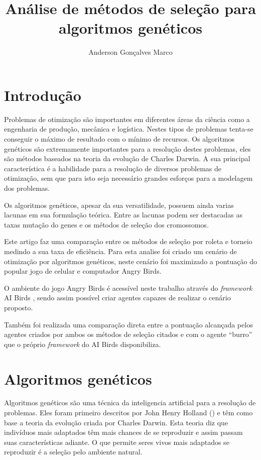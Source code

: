 \documentclass[10pt,a4paper]{article}
\title{Análise de métodos de seleção para algoritmos genéticos}
\author{Anderson Gonçalves Marco}
\date{}
\begin{document}

\maketitle
\section{Introdução}
Problemas de otimização são importantes em diferentes áreas da ciência como a engenharia de produção, mecânica e logística. Nestes tipos de problemas tenta-se conseguir o máximo de resultado com o mínimo de recursos. Os algoritmos genéticos são extremamente importantes para  a resolução destes problemas, eles são métodos baseados na teoria da evolução de Charles Darwin. A sua principal característica é a habilidade para a resolução de diversos problemas de otimização, sem que para isto seja necessário grandes esforços para a modelagem dos problemas.

Os algoritmos genéticos, apesar da sua versatilidade, possuem ainda varias lacunas em sua formulação teórica. Entre as lacunas podem ser destacadas as taxas mutação do genes  e os métodos de seleção dos cromossomos.

Este artigo faz uma comparação entre os métodos de seleção por roleta e torneio medindo a sua taxa de eficiência. Para esta analise foi criado um cenário de otimização por algoritmos genéticos, neste cenário foi maximizado a pontuação do popular jogo de celular e computador Angry Birds. 

O ambiente do jogo Angry Birds é acessível neste trabalho através do \emph{framework} AI Birds \cite{aiBirds}, sendo assim possível criar agentes capazes de realizar o cenário proposto. 

Também foi realizada uma comparação direta entre a pontuação alcançada pelos agentes criados por ambos os métodos de seleção citados e com o agente ``burro'' que o próprio \emph{framework} do AI Birds disponibiliza.

\section{Algoritmos genéticos}
Algoritmos genéticos são uma técnica da inteligencia artificial para a resolução de problemas. Eles foram primeiro descritos por  John Henry Holland (\cite{primeiroAUsarAG}) e têm como  base a teoria da evolução criada por Charles Darwin. Esta teoria diz que indivíduos mais adaptados têm mais chances de se reproduzir e assim passam suas características adiante. O que permite seres vivos mais adaptados se reproduzir é a seleção pelo ambiente natural.
\end{document}
